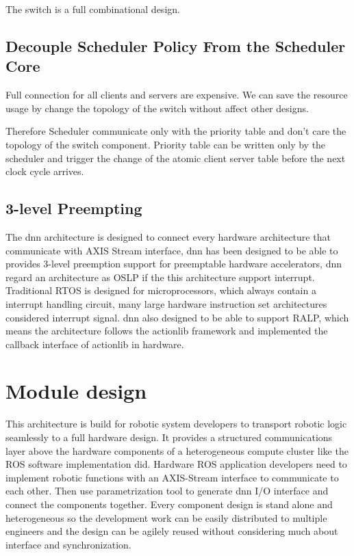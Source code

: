 The switch is a full combinational design.

\subsection{Decouple Scheduler Policy From the Scheduler Core}

Full connection for all clients and servers are expensive. We can save the resource usage by change the topology of the switch without affect other designs.

Therefore Scheduler communicate only with the priority table and don't care the topology of the switch component. Priority table can be written only by the scheduler and trigger the change of the atomic client server table before the next clock cycle arrives.


\subsection{3-level Preempting}

The \gls{dnn}  architecture is designed to connect every hardware architecture that communicate with AXIS Stream interface, \gls{dnn}  has been designed to be able to provides 3-level preemption support for preemptable hardware accelerators, \gls{dnn}  regard an architecture as OSLP if the this architecture support interrupt. Traditional RTOS is designed for microprocessors, which always contain a interrupt handling circuit, many large hardware instruction set architectures considered interrupt signal.  \gls{dnn}  also designed to be able to support RALP, which means the architecture follows the actionlib framework and implemented the callback interface of actionlib in hardware. 




\section{Module design}

This architecture is build for robotic system developers to transport robotic logic seamlessly to a full hardware design. It provides a structured communications layer above the hardware components of a heterogeneous compute cluster like the ROS software implementation did. Hardware ROS application developers need to implement robotic functions with an AXIS-Stream interface to communicate to each other. Then use parametrization tool to generate \gls{dnn}  I/O interface and connect the components together. Every component design is stand alone and heterogeneous so the development work can be easily distributed to multiple engineers and the design can be agilely reused without considering much about interface and synchronization.

